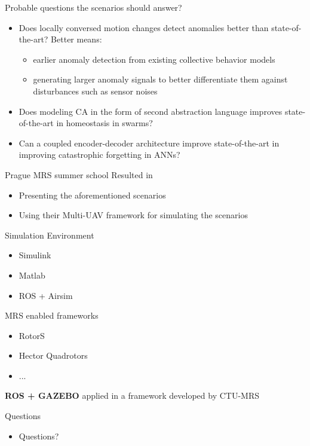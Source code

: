 \documentclass[unknownkeysallowed]{beamer}
\begin{document}
	\begin{frame}{Probable questions the scenarios should answer?}
		\begin{itemize}
			\item Does locally conversed motion changes detect anomalies better than state-of-the-art? Better means:
			\begin{itemize}
				\item earlier anomaly detection from existing collective behavior models
				\item generating larger anomaly signals to better differentiate them against disturbances such as sensor noises
			\end{itemize}
			\item Does modeling CA in the form of second abstraction language improves state-of-the-art in   homeostasis in swarms?
			\item Can a coupled encoder-decoder architecture improve state-of-the-art in improving catastrophic forgetting in ANNs? 
		\end{itemize}
	\end{frame}

	\begin{frame}{Prague MRS summer school}
		Resulted in
		\begin{itemize}
			\item Presenting the aforementioned scenarios
			\item Using their Multi-UAV framework for simulating the scenarios
		\end{itemize}
	\end{frame}

	\begin{frame}{Simulation Environment}
		\begin{itemize}
			\item Simulink
			\item Matlab
			\item ROS + Airsim
		\end{itemize}
		MRS enabled frameworks
		\begin{itemize}
			\item RotorS
			\item Hector Quadrotors 
			\item ...
		\end{itemize}
		\textbf{ROS + GAZEBO} applied in a framework developed by CTU-MRS
	\end{frame}

	\begin{frame}{Questions}
		\begin{itemize}
			\item Questions?
		\end{itemize}
	\end{frame}
\end{document}
